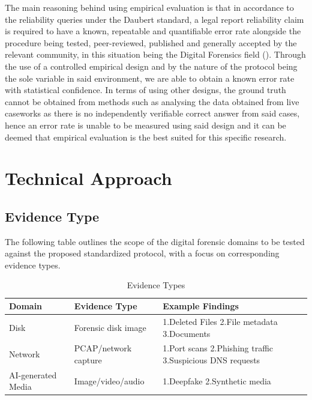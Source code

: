 \documentclass[a4paper]{report}
\begin{document}
\begin{justify}
The main reasoning behind using empirical evaluation is that in accordance to the reliability queries under the Daubert standard, a legal report reliability claim is required to have a known, repeatable and quantifiable error rate alongside the procedure being tested, peer-reviewed, published and generally accepted by the relevant community, in this situation being the Digital Forensics field (\cite{carranza2021software}). Through the use of a controlled empirical design and by the nature of the protocol being the sole variable in said environment, we are able to obtain a known error rate with statistical confidence. In terms of using other designs, the ground truth cannot be obtained from methods such as analysing the data obtained from live caseworks as there is no independently verifiable correct answer from said cases, hence an error rate is unable to be measured using said design and it can be deemed that empirical evaluation is the best suited for this specific research.

\section {Technical Approach}

\subsection{Evidence Type}
The following table outlines the scope of the digital forensic domains to be tested against the proposed standardized protocol, with a focus on corresponding evidence types.

\begin{table}[H]
\caption{Evidence Types}
\label{tab:inclusion-exclusion}

\fontsize{10pt}{12pt}\selectfont

\begin{tabular}{|p{4cm}|p{5cm}|p{5cm}|}
\hline
Domain & Evidence Type & Example Findings\\
\hline
Disk & Forensic disk image & 1.Deleted Files \newline 2.File metadata \newline 3.Documents\\
\hline
Network & PCAP/network capture & 1.Port scans \newline 2.Phishing traffic \newline 3.Suspicious DNS requests\\
\hline
AI-generated Media & Image/video/audio & 1.Deepfake \newline 2.Synthetic media \\
\hline
\end{tabular}
\end{table}


\end{justify}
\end{document}
